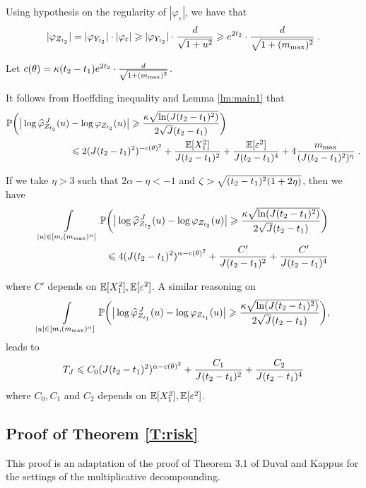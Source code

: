 Using hypothesis on the regularity of $|\varphi_{\varepsilon}|$, we have that
    \begin{equation*}
        |\varphi_{Z_{t_2}}| 
        = |\varphi_{Y_{t_2}}| \cdot |\varphi_{\varepsilon}| 
        \geqslant |\varphi_{Y_{t_2}}| \cdot \frac{d}{\sqrt{1 + u^2}} 
        \geqslant e^{2 t_2} \cdot \frac{d}{\sqrt{1 + (m_{\max})^2}} 
        \; .
    \end{equation*}

Let $c(\theta) = \kappa (t_2 - t_1)  e^{2 t_2} \cdot \frac{d}{\sqrt{1 + (m_{\max})^2}}$.

It follows from Hoeffding inequality and Lemma \ref{lm:main1} that 
    \begin{align*}
        \mathbb{P} \bigg( \big| \log \widehat \varphi_{Z_{t_2}}^{\, J}  (u) 
        &- \log \varphi_{Z_{t_2}} (u) \big| \geqslant \frac{\kappa \sqrt{\ln(J(t_2 - t_1)^2)}}{2 \sqrt{J}(t_2 - t_1)}\bigg) \\
        &\leqslant
        2(J(t_2 - t_1)^2)^{-c(\theta)^2} + \frac{\mathbb{E}[X_1^2]}{J (t_2 -t_1)^2} + \frac{ \mathbb{E}[\varepsilon^2]}{J (t_2 -t_1)^4} + 4 \frac{m_{\max}}{(J (t_2 -t_1)^2)^\eta}
        \; .
    \end{align*}

If we take $\eta > 3$ such that $2\alpha - \eta < -1$ and $\zeta > \sqrt{(t_2 -t_1)^2(1 + 2 \eta) }$, then we have
    \begin{equation*}
    \begin{split}
             \int\limits_{|u| \in [m, (m_{\max})^\alpha]}\mathbb{P} \bigg( \big| \log \widehat \varphi_{Z_{t_2}}^{\, J}  (u) 
        - \log \varphi_{Z_{t_2}} (u) \big|
        \geqslant \frac{\kappa \sqrt{\ln(J(t_2 - t_1)^2)}}{2 \sqrt{J}(t_2 - t_1)}\bigg) 
       \\
     \leqslant 4 (J (t_2 -t_1)^2)^{\alpha - c(\theta)^2} + \frac{C'}{J (t_2 -t_1)^2} + \frac{C'}{J (t_2 -t_1)^4}  
    \end{split}
    \end{equation*}
    
where $C'$ depends on $\mathbb{E}[X_1^2], \mathbb{E}[\varepsilon^2]$. A similar reasoning on 
$$              \int\limits_{|u| \in [m, (m_{\max})^\alpha]}\mathbb{P} \bigg( \big| \log \widehat \varphi_{Z_{t_1}}^{\, J}  (u) 
        - \log \varphi_{Z_{t_1}} (u) \big|
        \geqslant \frac{\kappa \sqrt{\ln(J(t_2 - t_1)^2)}}{2 \sqrt{J}(t_2 - t_1)}\bigg), $$
        leads to 
    $$ T_J \leqslant C_0 (J (t_2 -t_1)^2)^{\alpha - c(\theta)^2} + \frac{C_1}{J (t_2 -t_1)^2} + \frac{C_2}{J (t_2 -t_1)^4}  $$
where $C_0, C_1$ and $C_2$ depends on $\mathbb{E}[X_1^2], \mathbb{E}[\varepsilon^2]$.

\subsection{Proof of Theorem \ref{T:risk}}
\label{S:ProofMain} This proof is an adaptation of the proof of Theorem 3.1 of Duval and Kappus \cite{duval2019adaptive} for the settings of the multiplicative decompounding.\\

